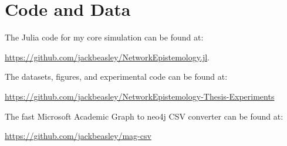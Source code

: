 \hypertarget{code-and-data}{%
\chapter*{Code and Data}\label{code-and-data}}

The Julia code for my core simulation can be found at:

\url{https://github.com/jackbeasley/NetworkEpistemology.jl}.

\noindent The datasets, figures, and experimental code can be found at:

\url{https://github.com/jackbeasley/NetworkEpistemology-Thesis-Experiments}

\noindent The fast Microsoft Academic Graph to neo4j CSV converter can
be found at:

\url{https://github.com/jackbeasley/mag-csv}
